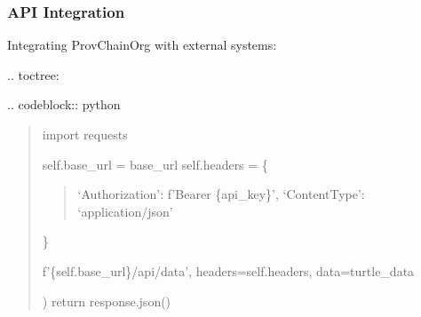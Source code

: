 \documentclass[letterpaper,10pt,english]{sphinxmanual}
\begin{document}
\subsubsection{API Integration}
\label{\detokenize{user-guide/index:api-integration}}
\sphinxAtStartPar
Integrating ProvChainOrg with external systems:

\sphinxAtStartPar
{}
.. toctree:

\begin{sphinxVerbatim}[commandchars=\\\{\}]
 
  

\end{sphinxVerbatim}

\sphinxAtStartPar
{}
.. code\sphinxhyphen{}block:: python
\begin{quote}

\sphinxAtStartPar
import requests
\begin{description}
\begin{description}
\sphinxAtStartPar
self.base\_url = base\_url
self.headers = \{
\begin{quote}

\sphinxAtStartPar
‘Authorization’: f’Bearer \{api\_key\}’,
‘Content\sphinxhyphen{}Type’: ‘application/json’
\end{quote}

\sphinxAtStartPar
\}

\begin{description}
\sphinxAtStartPar
f’\{self.base\_url\}/api/data’,
headers=self.headers,
data=turtle\_data

\end{description}

\sphinxAtStartPar
)
return response.json()

\end{description}

\end{description}
\end{quote}
\end{document}
